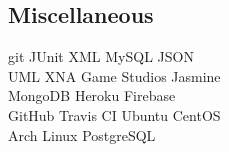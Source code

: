 \documentclass[]{deedy-resume-openfont}
\begin{document}
\begin{minipage}[t]{0.33\textwidth}
\subsection{Miscellaneous}
git \textbullet{} JUnit \textbullet{} XML \textbullet{} MySQL \textbullet{} JSON \\ 
UML \textbullet{} XNA Game Studios \textbullet{} Jasmine \\
MongoDB \textbullet{} Heroku \textbullet{} Firebase \\
GitHub \textbullet{} Travis CI \textbullet{} Ubuntu \textbullet{} CentOS \\
Arch Linux \textbullet{} PostgreSQL
\sectionsep

%
%

\end{minipage} 
\hfill
\end{document}
